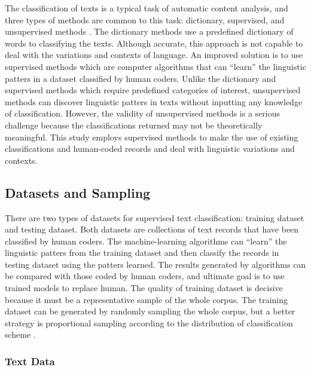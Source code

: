 \documentclass[12pt]{article}
\begin{document}
The classification of texts is a typical task of automatic content analysis, and three types of methods are common to this task: dictionary, supervised, and unsupervised methods \parencite[268-269]{GrimmerTextDataPromise2013}. The dictionary methods use a predefined dictionary of words to classifying the texts. Although accurate, this approach is not capable to deal with the variations and contexts of language. An improved solution is to use supervised methods which are computer algorithms that can ``learn'' the linguistic patters in a dataset classified by human coders. Unlike the dictionary and supervised methods which require predefined categories of interest, unsupervised methods can discover linguistic patters in texts without inputting any knowledge of classification. However, the validity of unsupervised methods is a serious challenge because the classifications returned may not be theoretically meaningful. This study employs supervised methods to make the use of existing classifications and human-coded records and deal with linguistic variations and contexts. 



\subsection{Datasets and Sampling}

There are two types of datasets for supervised text classification: training dataset and testing dataset. Both datasets are collections of text records that have been classified by human coders. The machine-learning algorithms can ``learn'' the linguistic patters from the training dataset and then classify the records in testing dataset using the patters learned. The results generated by algorithms can be compared with those coded by human coders, and ultimate goal is to use trained models to replace human. The quality of training dataset is decisive because it must be a representative sample of the whole corpus. The training dataset can be generated by randomly sampling the whole corpus, but a better strategy is proportional sampling according to the distribution of classification scheme \parencite[278]{GrimmerTextDataPromise2013}.

\subsubsection{Text Data}
\parencites{HodgkinsonMappingnonprofitsector1990}[16]{NationalCenterforCharitableStatisticsGuideUsingNCCS2006}
\end{document}
